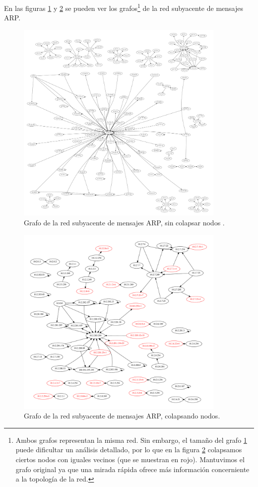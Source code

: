 \par En las figuras \ref{ARPDC-sinColapsar} y \ref{ARPDC} se pueden ver los grafos\footnote{Ambos grafos representan la misma red. Sin embargo, el tamaño del grafo \ref{ARPDC-sinColapsar} puede dificultar un análisis detallado, por lo que en la figura \ref{ARPDC} colapsamos ciertos nodos con iguales vecinos (que se muestran en rojo). Mantuvimos el grafo original ya que una mirada rápida ofrece más información concerniente a la topología de la red.} de la red subyacente de mensajes ARP.

\begin{figure}[ht]
    \centering
    \includegraphics[width=0.9\textwidth]{figuras/ciudad_10_grafoSinColapsar.pdf}
    \caption{Grafo de la red subyacente de mensajes ARP, sin colapsar nodos .}\label{ARPDC-sinColapsar}
\end{figure}

\begin{figure}[ht]
    \centering
    \includegraphics[width=0.9\textwidth]{figuras/ciudad_10_grafo.pdf}
    \caption{Grafo de la red subyacente de mensajes ARP, colapsando nodos.}\label{ARPDC}
\end{figure}


